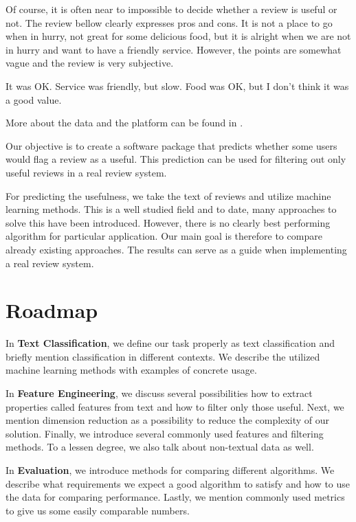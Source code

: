 Of course, it is often near to impossible to decide whether a review is useful or not.
The review bellow clearly expresses pros and cons.
It is not a place to go when in hurry, not great for some delicious food,
but it is alright when we are not in hurry and want to have a friendly service.
However, the points are somewhat vague and the review is very subjective.

\begin{code}
It was OK. Service was friendly, but slow.
Food was OK, but I don't think it was a good value.
\end{code}


More about the data and the platform can be found in .

Our objective is to create a software package that predicts whether some users would flag a review as a useful.
This prediction can be used for filtering out only useful reviews in a real review system.

For predicting the usefulness, we take the text of reviews and utilize machine learning methods.
This is a well studied field and to date, many approaches to solve this have been introduced.
However, there is no clearly best performing algorithm for particular application.
Our main goal is therefore to compare already existing approaches.
The results can serve as a guide when implementing a real review system.

\section{Roadmap}

In \textbf{ Text Classification}, we define our task properly as text classification and briefly mention classification in different contexts.
We describe the utilized machine learning methods with examples of concrete usage.

In \textbf{ Feature Engineering}, we discuss several possibilities how to extract properties called features from text and how to filter only those useful.
Next, we mention dimension reduction as a possibility to reduce the complexity of our solution.
Finally, we introduce several commonly used features and filtering methods.
To a lessen degree, we also talk about non-textual data as well.

In \textbf{ Evaluation}, we introduce methods for comparing different algorithms.
We describe what requirements we expect a good algorithm to satisfy and how to use the data for comparing performance.
Lastly, we mention commonly used metrics to give us some easily comparable numbers.

